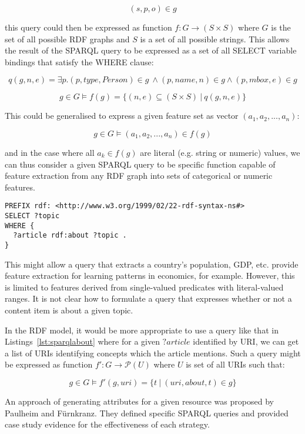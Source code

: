 \begin{displaymath}
  (s, p, o) \in g
\end{displaymath}

\noindent this query could then be
expressed as function $f: G \rightarrow (S \times S)$ where $G$ is the set of
all possible RDF graphs and $S$ is a set of all possible strings.
This allows the result of the
SPARQL query to be expressed as a set of all SELECT variable bindings that
satisfy the WHERE clause:

$$
q(g,n,e) = \exists p . (p, type, Person) \in g\ \land (p, name, n) \in g \land (p, mbox, e) \in g
$$

$$
g \in G \models f(g) = \{(n, e) \subseteq (S \times S) \: | \: q(g,n,e)\}
$$

This could be generalised to express a given feature set as
vector $(a_1, a_2, ..., a_n)$:

$$
g \in G \models (a_1, a_2, ..., a_n) \in f(g)
$$

\noindent and in the case where all $a_k \in f(g)$ are literal (e.g. string or
numeric) values, we can thus consider a given SPARQL query to be specific
function capable of feature extraction from any RDF graph into sets of
categorical or numeric features.

\begin{lstlisting}[label=lst:sparqlabout,caption={SPARQL query to determine what },language=sparql]
PREFIX rdf: <http://www.w3.org/1999/02/22-rdf-syntax-ns#>
SELECT ?topic
WHERE {
  ?article rdf:about ?topic .
}
\end{lstlisting}

This might allow a query that extracts a country's population, GDP, etc.
provide feature extraction for learning patterns in economics, for example.
However, this is limited to features derived from single-valued predicates
with literal-valued ranges. It is not clear how to formulate a query that
expresses whether or not a content item is about a given topic.

In the RDF
model, it would be more appropriate to use a query like that in
Listings~\ref{lst:sparqlabout} where for a given $?article$ identified by
URI, we can get a list of URIs identifying concepts which the article mentions.
Such a query might be expressed as function $f': G \rightarrow \mathcal P(U)$ where $U$ is
set of all URIs such that:

$$
g \in G \models f'(g, uri) = \{t \: | \: (uri, about, t) \in g\}
$$

An approach of generating attributes for a given resource was proposed by
Paulheim and F\"urnkranz\cite{paulheim2012unsupervised}. They defined specific
SPARQL queries and provided case study evidence for the effectiveness of
each strategy.

